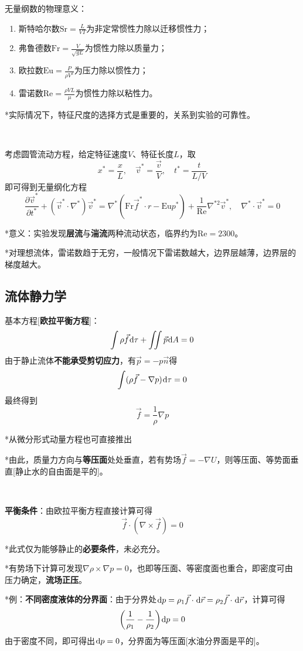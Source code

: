 \documentclass[a4paper,UTF8,fontset=windows]{ctexart}
\newcommand*{\dr}{\hspace{0.07em}\mathrm{d}}
\begin{document}
无量纲数的物理意义：
\begin{enumerate}
    \item 斯特哈尔数$\mathrm{Sr}=\frac{L}{VT}$为非定常惯性力除以迁移惯性力；
    \item 弗鲁德数$\mathrm{Fr}=\frac{V}{\sqrt{gL}}$为惯性力除以质量力；
    \item 欧拉数$\mathrm{Eu}=\frac{P}{\rho V^2}$为压力除以惯性力；
    \item 雷诺数$\mathrm{Re}=\frac{\rho VL}{\mu}$为惯性力除以粘性力。
\end{enumerate}

*实际情况下，特征尺度的选择方式是重要的，关系到实验的可靠性。

\

考虑圆管流动方程，给定特征速度$V$、特征长度$L$，取
$$x^*=\frac{x}{L},\quad \vec{v}^*=\frac{\vec{v}}{V},\quad t^*=\frac{t}{L/V}$$
即可得到无量纲化方程
$$\frac{\partial \vec{v}^*}{\partial t^*}+(\vec{v}^*\cdot\nabla^*)\vec{v}^*=\nabla^*(\mathrm{Fr}\vec{f}^*\cdot r-\mathrm{Eu}p^*)+\frac{1}{\mathrm{Re}}\nabla^{*2}\vec{v}^*,\quad\nabla^*\cdot\vec{v}^*=0$$

*意义：实验发现\textbf{层流}与\textbf{湍流}两种流动状态，临界约为$\mathrm{Re}=2300$。

*对理想流体，雷诺数趋于无穷，一般情况下雷诺数越大，边界层越薄，边界层的梯度越大。

\subsection{流体静力学}
基本方程[\textbf{欧拉平衡方程}]：
$$\int\rho\vec{f}\dr\tau+\iint\vec{p}\dr A=0$$
由于静止流体\textbf{不能承受剪切应力}，有$\vec{p}=-p\vec{n}$得
$$\int(\rho \vec{f}-\nabla p)\dr\tau=0$$
最终得到
$$\vec{f}=\frac{1}{\rho}\nabla p$$

*从微分形式动量方程也可直接推出

*由此，质量力方向与\textbf{等压面}处处垂直，若有势场$\vec{f}=-\nabla U$，则等压面、等势面垂直[静止水的自由面是平的]。

\

\textbf{平衡条件}：由欧拉平衡方程直接计算可得
$$\vec{f}\cdot(\nabla\times\vec{f})=0$$

*此式仅为能够静止的\textbf{必要条件}，未必充分。

*有势场下计算可发现$\nabla\rho\times\nabla p=0$，也即等压面、等密度面也重合，即密度可由压力确定，\textbf{流场正压}。

*例：\textbf{不同密度液体的分界面}：由于分界处$\dr p=\rho_1\vec{f}\cdot\dr\vec{r}=\rho_2\vec{f}\cdot\dr\vec{r}$，计算可得
$$\bigg(\frac{1}{\rho_1}-\frac{1}{\rho_2}\bigg)\dr p=0$$
由于密度不同，即可得出$\dr p=0$，分界面为等压面[水油分界面是平的]。
\end{document}
